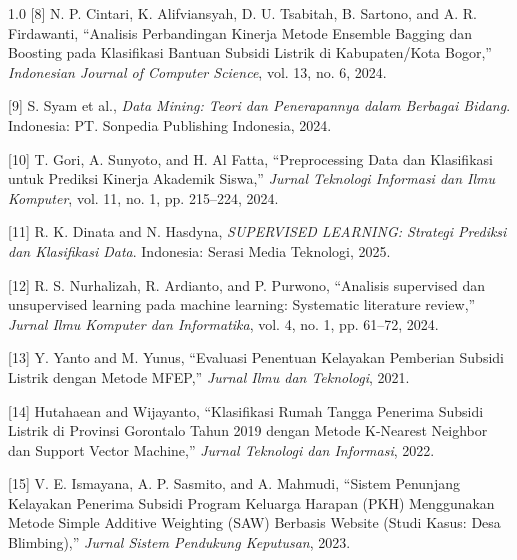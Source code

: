 \documentclass[12pt, a4paper, onecolumn, oneside]{report}
\begin{document}
\begin{spacing}{1.0}
\vspace{0.3cm}
\noindent\hangindent=1.5cm
{[8]} N. P. Cintari, K. Alifviansyah, D. U. Tsabitah, B. Sartono, and A. R. Firdawanti, ``Analisis Perbandingan Kinerja Metode Ensemble Bagging dan Boosting pada Klasifikasi Bantuan Subsidi Listrik di Kabupaten/Kota Bogor,'' \textit{Indonesian Journal of Computer Science}, vol. 13, no. 6, 2024.

\vspace{0.3cm}
\noindent\hangindent=1.5cm
{[9]} S. Syam et al., \textit{Data Mining: Teori dan Penerapannya dalam Berbagai Bidang}. Indonesia: PT. Sonpedia Publishing Indonesia, 2024.

\vspace{0.3cm}
\noindent\hangindent=1.5cm
{[10]} T. Gori, A. Sunyoto, and H. Al Fatta, ``Preprocessing Data dan Klasifikasi untuk Prediksi Kinerja Akademik Siswa,'' \textit{Jurnal Teknologi Informasi dan Ilmu Komputer}, vol. 11, no. 1, pp. 215--224, 2024.

\vspace{0.3cm}
\noindent\hangindent=1.5cm
{[11]} R. K. Dinata and N. Hasdyna, \textit{SUPERVISED LEARNING: Strategi Prediksi dan Klasifikasi Data}. Indonesia: Serasi Media Teknologi, 2025.

\vspace{0.3cm}
\noindent\hangindent=1.5cm
{[12]} R. S. Nurhalizah, R. Ardianto, and P. Purwono, ``Analisis supervised dan unsupervised learning pada machine learning: Systematic literature review,'' \textit{Jurnal Ilmu Komputer dan Informatika}, vol. 4, no. 1, pp. 61--72, 2024.

\vspace{0.3cm}
\noindent\hangindent=1.5cm
{[13]} Y. Yanto and M. Yunus, ``Evaluasi Penentuan Kelayakan Pemberian Subsidi Listrik dengan Metode MFEP,'' \textit{Jurnal Ilmu dan Teknologi}, 2021.

\vspace{0.3cm}
\noindent\hangindent=1.5cm
{[14]} Hutahaean and Wijayanto, ``Klasifikasi Rumah Tangga Penerima Subsidi Listrik di Provinsi Gorontalo Tahun 2019 dengan Metode K-Nearest Neighbor dan Support Vector Machine,'' \textit{Jurnal Teknologi dan Informasi}, 2022.

\vspace{0.3cm}
\noindent\hangindent=1.5cm
{[15]} V. E. Ismayana, A. P. Sasmito, and A. Mahmudi, ``Sistem Penunjang Kelayakan Penerima Subsidi Program Keluarga Harapan (PKH) Menggunakan Metode Simple Additive Weighting (SAW) Berbasis Website (Studi Kasus: Desa Blimbing),'' \textit{Jurnal Sistem Pendukung Keputusan}, 2023.


\end{spacing}
\end{document}
